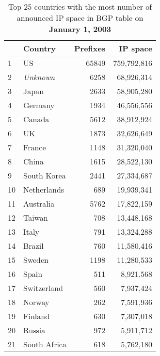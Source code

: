 \begin{table*}[tp]
\begin{minipage}[t]{0.48\textwidth}
	\begin{center}
	\caption{Top 25 countries with the most number of announced IP space in BGP table on \textbf{January 1, 2003}}
	\label{tab:top25 bgp ip space 2003}
	\begin{tabular}{|l||l|r|r|}
		\hline
		&      \bf Country		&    Prefixes   &       IP space 		\tabularnewline \hline 
1       &       US      		&       65849   &       759,792,816     \tabularnewline %
2       &       \emph{Unknown} 	&       6258    &       68,926,314      \tabularnewline %
3       &       Japan   		&       2633    &       58,905,280      \tabularnewline %
4       &       Germany 		&       1934    &       46,556,556      \tabularnewline %
5       &       Canada  		&       5612    &       38,912,924      \tabularnewline %
6       &       UK      		&       1873    &       32,626,649      \tabularnewline %
7       &       France  		&       1148    &       31,320,040      \tabularnewline %
8       &       China   		&       1615    &       28,522,130      \tabularnewline %
9       &       South Korea     &       2441    &       27,334,687      \tabularnewline %
10      &       Netherlands     &       689     &       19,939,341      \tabularnewline %
11      &       Australia       &       5762    &       17,822,159      \tabularnewline %
12      &       Taiwan  		&       708     &       13,448,168      \tabularnewline %
13      &       Italy   		&       791     &       13,324,288      \tabularnewline %
14      &       Brazil  		&       760     &       11,580,416      \tabularnewline %
15      &       Sweden  		&       1198    &       11,280,533      \tabularnewline %
16      &       Spain   		&       511     &       8,921,568       \tabularnewline %
17      &       Switzerland     &       560     &       7,937,424       \tabularnewline %
18      &       Norway  		&       262     &       7,591,936       \tabularnewline %
19      &       Finland 		&       630     &       7,307,018       \tabularnewline %
20      &       Russia  		&       972     &       5,911,712       \tabularnewline %
21      &       South Africa    &       618     &       5,762,180       \tabularnewline %

\end{tabular}
\end{center}
\end{minipage}
\end{table*}
